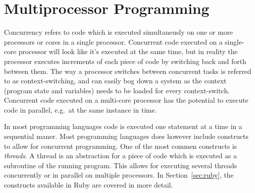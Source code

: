 \section{Multiprocessor Programming} %
\label{sec:multiprocessor}
Concurrency refers to code which is executed simultaneusly on one or more
processors or cores in a single processor. Concurrent code executed on a
single-core processor will look like it's executed at the same time, but in
reality the processor executes increments of each piece of code by switching
back and forth between them. The way a processor switches between concurrent
tasks is referred to as context-switching, and can easily bog down a system as
the context (program state and variables) needs to be loaded for every
context-switch.  Concurrent code executed on a multi-core processor has the
potential to execute code in parallel, e.g.\ at the same instance in time.

In most programming languages code is executed one statement at a time in a
sequential maner. Most programming languages does however include constructs
to allow for concurrent programming.  One of the most commen constructs is
\textit{threads}. A thread is an abstraction for a piece of code which is
executed as a subroutine of the running program. This allows for executing
several threads concurrently or in parallel on multiple processors.  In
Section~\ref{sec:ruby}, the constructs available in Ruby are covered in more
detail.

